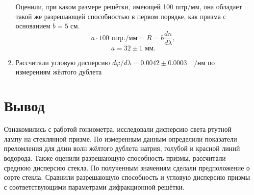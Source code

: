 \begin{enumerate}
	Оценили, при каком размере решётки, имеющей 100 штр/мм, она обладает такой же разрешающей способностью в первом порядке, как призма с основанием $b = 5$ см.
	\begin{equation*}
	a\cdot100\text{ штр./мм} = R = b\dfrac{dn}{d\lambda},
	\end{equation*}
	\begin{equation*}
	a = 32\pm1 \text{ мм}.
	\end{equation*}
	\item Рассчитали угловую дисперсию $d\varphi/d\lambda = 0.0042\pm0.0003\text{ }^\circ\text{/нм}$ по измерениям жёлтого дублета %
\end{enumerate}

\section{Вывод}
Ознакомились с работой гониометра, исследовали дисперсию света ртутной лампу на стеклянной призме. По измеренным данным определили показатели преломления для длин волн жёлтого дублета натрия, голубой и красной линий водорода. Также оценили разрешающую способность призмы, рассчитали среднюю дисперсию стекла. По полученным значениям сделали предположение о сорте стекла. Сравнили разрешающую способность и угловую дисперсию призмы с соответствующими параметрами дифракционной решётки.

